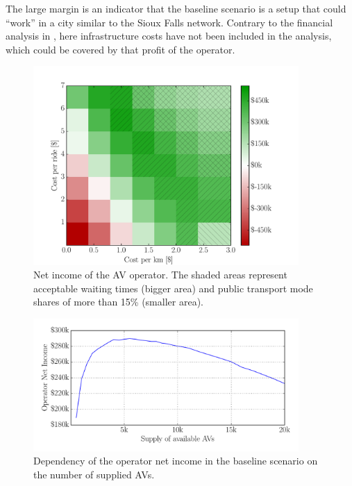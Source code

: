The large margin is an indicator that the baseline scenario is a setup
that could ``work'' in a city similar to the Sioux Falls network. Contrary to
the financial analysis in , here infrastructure costs have not been
included in the analysis, which could be covered by that profit of the operator.

\begin{figure}
    \centering
    \includegraphics[width=0.9\textwidth]{figures/netincomegrid.pdf}
    \caption{Net income of the AV operator. The shaded areas represent acceptable
    waiting times (bigger area) and public transport mode shares of more than
    15\% (smaller area).}
    \label{fig:netincomegrid}
\end{figure}

\begin{figure}
    \centering
    \includegraphics[width=0.9\textwidth]{figures/revenuesupply.pdf}
    \caption{Dependency of the operator net income in the baseline scenario on
    the number of supplied AVs.}
    \label{fig:revenuesupply}
\end{figure}

